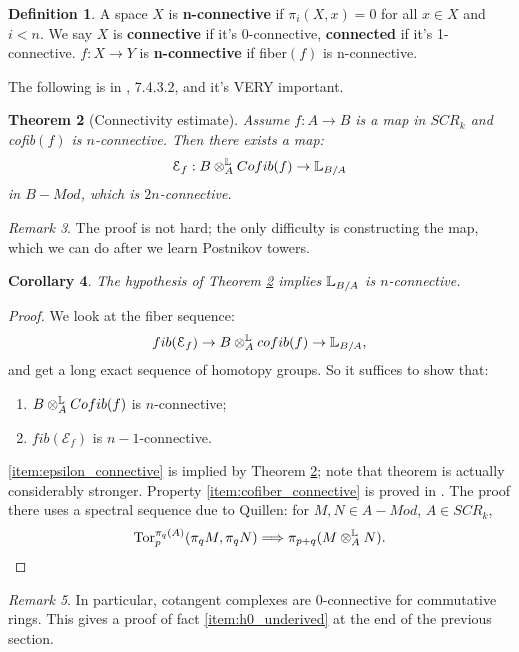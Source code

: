 \documentclass[10pt,a4paper,reqno,oneside]{book} %
\theoremstyle{plain}
\newtheorem{thm}{Theorem}[section]
\newtheorem{cor}[thm]{Corollary}
\theoremstyle{definition}
\newtheorem{defin}[thm]{Definition}
\theoremstyle{remark}
\newtheorem{rem}[thm]{Remark}
\numberwithin{equation}{section}
\begin{document}
\begin{defin}
A space $X$ is \textbf{n-connective} if $\pi_i(X,x) = 0$ for all $x \in X$ and $i<n$. We say $X$ is \textbf{connective}
if it's 0-connective, \textbf{connected} if it's 1-connective. $f:X \to Y$ is \textbf{n-connective} if fiber$(f)$ is n-connective.
\end{defin}

The following is in \cite{Lurie_Higher_algebra}, 7.4.3.2, and it's VERY important.
\begin{thm}[Connectivity estimate]
\label{thm:connectivity_estimate}
Assume $f : A \to B$ is a map in $SCR_k$ and cofib$(f)$ is $n$-connective. Then there exists a map:
\[	\mathcal{E}_f: B \otimes_A^{\mathbb L} Cofib(f) \to \mathbb L_{B/A}	\]
in $B-Mod$, which is $2n$-connective.
\end{thm}

\begin{rem}
The proof is not hard; the only difficulty is constructing the map, which we can do after we learn Postnikov towers.
\end{rem}

\begin{cor}
The hypothesis of Theorem \ref{thm:connectivity_estimate} implies $\mathbb L_{B/A}$ is $n$-connective.
\end{cor}
\begin{proof}
We look at the fiber sequence:
\[	fib(\mathcal{E}_f) \to B\otimes^{\mathbb L}_A cofib(f) \to \mathbb L_{B/A},	\]
and get a long exact sequence of homotopy groups. So it suffices to show that:
\begin{enumerate}
\item \label{item:cofiber_connective}
 $B\otimes_A^{\mathbb L} Cofib(f)$ is $n$-connective;
\item \label{item:epsilon_connective}
$fib(\mathcal{E}_f)$ is $n-1$-connective.
\end{enumerate}
\ref{item:epsilon_connective} is implied by Theorem \ref{thm:connectivity_estimate}; note that theorem is actually considerably
stronger. Property \ref{item:cofiber_connective} is proved in \cite{Sq0}. The proof there uses a spectral sequence due to 
Quillen: for $M,N \in A-Mod$, $A \in SCR_k$,
\[	\mathrm{Tor}_p^{\pi_q(A)}(\pi_qM, \pi_qN) \Longrightarrow \pi_{p+q}(M \otimes^{\mathbb L}_A N).	\]
\end{proof}

\begin{rem}
In particular, cotangent complexes are 0-connective for commutative rings. This gives a proof of fact
\ref{item:h0_underived} at the end of the previous section.
\end{rem}
\end{document}
